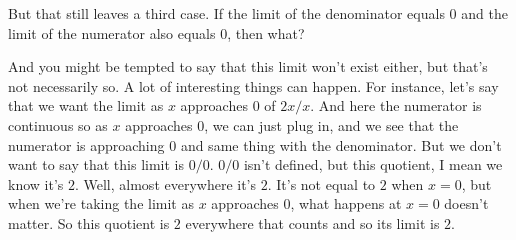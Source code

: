 \documentclass[pdftex, brazil, 12pt, twoside]{article}
\begin{document}
\begin{figure}[H]
  \begin{center}
  \end{center}
\end{figure}

But that still leaves a third case.
If the limit of the denominator equals
$0$ and the limit of the numerator also equals $0$, then what?

\begin{figure}[H]
  \begin{center}
  \end{center}
\end{figure}

And you might be tempted to say that this limit won't
exist either, but that's not necessarily so.
A lot of interesting things can happen.
For instance, let's say that we want the limit as $x$ approaches
$0$ of $2x/x$.
And here the numerator is continuous
so as $x$ approaches $0$, we can just plug in,
and we see that the numerator is approaching $0$ and same thing
with the denominator.
But we don't want to say that this limit is $0/0$.
$0/0$ isn't defined, but this quotient, I
mean we know it's $2$.
Well, almost everywhere it's $2$.
It's not equal to $2$ when $x = 0$, but when
we're taking the limit as $x$ approaches $0$, what happens
at $x = 0$ doesn't matter.
So this quotient is $2$ everywhere that counts
and so its limit is $2$.
\end{document}
